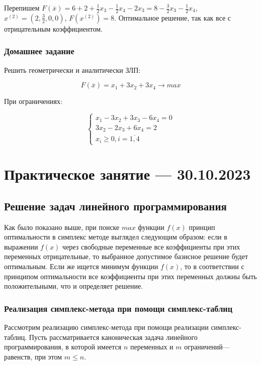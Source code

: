\documentclass{article}
\begin{document}
Перепишем $F(\overline{x}) = 6 + 2 + \frac{1}{2} x_3 - \frac{1}{2} x_4 - 2x_3 = 8 - \frac{3}{2} x_3 - \frac{1}{2} x_4$, $x^{(2)} = (2, \frac{3}{2}, 0, 0)$, $F(x^{(2)}) = 8$. Оптимальное решение, так как все с отрицательным коэффициентом.

\subsubsection{Домашнее задание}

Решить геометрически и аналитически ЗЛП:

$$
F(\overline{x}) = x_1 + 3x_2 + 3x_4 \to max
$$

При ограничениях:

$$
\begin{cases}
    x_1 - 3x_2 + 3x_3 - 6x_4 = 0 \\
    3x_2 - 2x_3 + 6x_4 = 2 \\
    x_{i} \ge 0, i = \overline{1, 4}
\end{cases}
$$

\section{Практическое занятие — 30.10.2023}

\subsection{Решение задач линейного программирования}

Как было показано выше, при поиске $max$ функции $f(x)$ принцип оптимальности в симплекс методе выглядел следующим образом: если в выражении $f(x)$ через свободные переменные все коэффициенты при этих переменных отрицательные, то выбранное допустимое базисное решение будет оптимальным. Если же ищется минимум функции $f(x)$, то в соответствии с принципом оптимальности все коэффициенты при этих переменных должны быть положительными, что и определяет решение.

\subsubsection{Реализация симплекс-метода при помощи симплекс-таблиц}

Рассмотрим реализацию симплекс-метода при помощи реализации симплекс-таблиц. Пусть рассматривается каноническая задача линейного программирования, в которой имеется $n$ переменных и $m$ ограничений—равенств, при этом $m \le n$.
\end{document}

